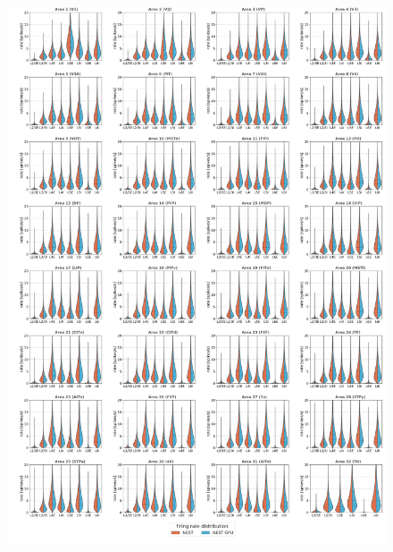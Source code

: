 \documentclass[a4paper, 12pt, twoside, openright]{book}
\begin{document}
\begin{figure}[H]
    \centering
    \includegraphics[width=\columnwidth]{figures/dist_violinplot_vert_gs_firing_rate.pdf}
\end{figure}
\end{document}
